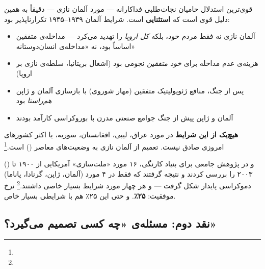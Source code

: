 \begin{tcolorbox}[enemybox, title={مشکل بنیادین: آلمان نازی استثناست، نه قاعده}]
قوی‌ترین استدلال حامیان نجات‌طلبی فداکارانه — مورد آلمان نازی — دقیقاً به همین دلیل قوی است که \textbf{استثنایی} است. شرایط آلمان ۱۹۳۹–۱۹۴۵ تکرارناپذیر بود:

\begin{itemize}
\item آلمان نازی نه فقط مردم خود، بلکه \textit{کل اروپا} را تهدید می‌کرد — مداخله‌ی متفقین اساساً  بود، نه «مداخله‌ی انسان‌دوستانه»
\item هزینه‌ی عدم مداخله برای \textit{خود متفقین} نجومی بود (اشغال بریتانیا، سلطه‌ی نازی بر اروپا)
\item پس از جنگ، منافع ژئوپولیتیک متفقین (مهار شوروی) با بازسازی آلمان و ژاپن \textit{هم‌راستا} بود
\item آلمان و ژاپن پیش از جنگ جوامع صنعتی مدرن با بوروکراسی کارآمد بودند
\end{itemize}

\textbf{هیچ‌یک از این شرایط} در مورد عراق، لیبی، افغانستان، سوریه، یا اکثر کشورهای امروزی صادق نیست. تعمیم از آلمان نازی به وضعیت‌های معاصر  () است.\footnote{}
\end{tcolorbox}

 () و  در پژوهش جامعی برای بنیاد کارنگی، ۱۶ مورد «ملت‌سازی» آمریکایی از ۱۹۰۰ تا ۲۰۰۳ را بررسی کردند و نتیجه گرفتند که فقط در ۴ مورد (آلمان، ژاپن، گرنادا، پاناما) دموکراسی پایدار شکل گرفت — و هر چهار مورد شرایط بسیار خاصی داشتند.\footnote{} نرخ موفقیت: \textbf{۲۵٪}. و حتی این ۲۵٪ هم با شرایطی بسیار خاص.

\subsection{نقد دوم: مسئله‌ی «چه کسی تصمیم می‌گیرد؟»}
\label{subsec:ch15-critique-who-decides}

